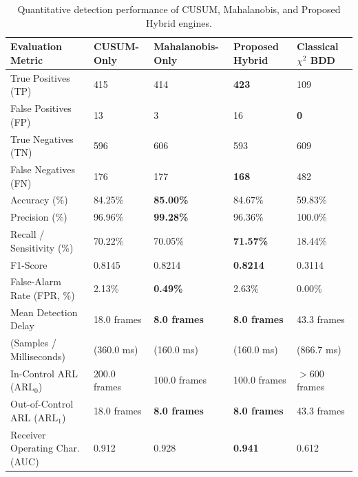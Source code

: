 \documentclass[11pt,a4paper]{report}
\begin{document}
\begin{table}[H]
\centering
\caption{Quantitative detection performance of CUSUM, Mahalanobis, and Proposed Hybrid engines.}
\label{tab:detection_performance}
\small
\renewcommand{\arraystretch}{1.25}
\begin{tabular}{|p{4.2cm}|p{2.2cm}|p{2.4cm}|p{2.4cm}|p{2.4cm}|}
\hline
\textbf{Evaluation Metric} & \textbf{CUSUM-Only} & \textbf{Mahalanobis-Only} & \textbf{Proposed Hybrid} & \textbf{Classical $\chi^2$ BDD} \\
\hline
True Positives (TP) & 415 & 414 & \textbf{423} & 109 \\
\hline
False Positives (FP) & 13 & 3 & 16 & \textbf{0} \\
\hline
True Negatives (TN) & 596 & 606 & 593 & 609 \\
\hline
False Negatives (FN) & 176 & 177 & \textbf{168} & 482 \\
\hline
Accuracy (\%) & 84.25\% & \textbf{85.00\%} & 84.67\% & 59.83\% \\
\hline
Precision (\%) & 96.96\% & \textbf{99.28\%} & 96.36\% & 100.0\% \\
\hline
Recall / Sensitivity (\%) & 70.22\% & 70.05\% & \textbf{71.57\%} & 18.44\% \\
\hline
F1-Score & 0.8145 & 0.8214 & \textbf{0.8214} & 0.3114 \\
\hline
False-Alarm Rate (FPR, \%) & 2.13\% & \textbf{0.49\%} & 2.63\% & 0.00\% \\
\hline
Mean Detection Delay & 18.0 frames & \textbf{8.0 frames} & \textbf{8.0 frames} & 43.3 frames \\
(Samples / Milliseconds) & (360.0 ms) & (160.0 ms) & (160.0 ms) & (866.7 ms) \\
\hline
In-Control ARL ($\text{ARL}_0$) & 200.0 frames & 100.0 frames & 100.0 frames & $> 600$ frames \\
\hline
Out-of-Control ARL ($\text{ARL}_1$) & 18.0 frames & \textbf{8.0 frames} & \textbf{8.0 frames} & 43.3 frames \\
\hline
Receiver Operating Char. (AUC)& 0.912 & 0.928 & \textbf{0.941} & 0.612 \\
\hline
\end{tabular}
\end{table}
\end{document}

